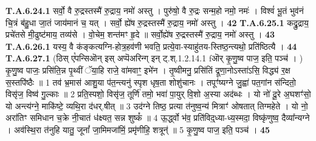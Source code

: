 \documentclass[17pt]{extarticle}
\begin{document}
                                                         \textbf{} \newline \newline
                                \textbf{ T.A.6.24.1} \newline
                  सर्वो॒ वै रु॒द्रस्तस्मै॑ रु॒द्राय॒ नमो॑ अस्तु ।  पुरु॑षो॒ वै रु॒द्रः सन्म॒हो नमो॒ नमः॑ ।  विश्वं॑ भू॒तं भुव॑नं चि॒त्रं ब॑हु॒धा जा॒तं जाय॑मानं च॒ यत् । सर्वो॒ ह्ये॑ष रु॒द्रस्तस्मै॑ रु॒द्राय॒ नमो॑ अस्तु । \textbf{ 42} \newline
                  \newline
                                                         \textbf{} \newline \newline
                                \textbf{ T.A.6.25.1} \newline
                  कद्रु॒द्राय॒ प्रचे॑तसे मी॒ढुष्ट॑माय॒ तव्य॑से । वो॒चेम॒ शन्त॑मꣳ हृ॒दे ॥ सर्वो॒ह्ये॑ष रु॒द्रस्तस्मै॑ रु॒द्राय॒ नमो॑ अस्तु । \textbf{ 43} \newline
                  \newline
                                                         \textbf{} \newline \newline
                                \textbf{ T.A.6.26.1} \newline
                  यस्य॒ वै क॑ङ्कत्यग्नि-होत्र॒हव॑णी भवति॒ प्रत्ये॒वा-स्याहु॑तय-स्तिष्ठ॒न्त्यथो॒ प्रति॑ष्ठित्यै । \textbf{ 44} \newline
                  \newline
                                                         \textbf{} \newline \newline
                                \textbf{ T.A.6.27.1} \newline
                  (ठिस् ए꣡पन्सिऒन् इस् अप्पॆअरिन्ग् इन् ट्.श्.1.2.14.1 fऒर् कृ॒णु॒ष्व पाज॒ इति॒ पञ्च॑ । )  कृ॒णु॒ष्व पाजः॒ प्रसि॑ति॒न्न पृ॒थ्वीं ॅया॒हि राजे॒ वा॑मवाꣳ॒॒ इभे॑न । तृ॒ष्वीमनु॒ प्रसि॑तिं द्रूणा॒नोऽस्ता॑ऽसि॒ विद्ध्य॑ र॒क्ष स॒स्तपि॑ष्ठैः ॥ 1  तव॑ भ्र॒मास॑ आशु॒या प॑त॒न्त्यनु॑ स्पृश धृष॒ता शोशु॑चानः । तपूꣳ॑ष्यग्ने जु॒ह्वा॑ पत॒गांन स॑न्दितो॒ विसृ॑ज॒ विष्व॑ गु॒ल्काः ॥ 2   प्रति॒स्पशो॒ विसृ॑ज॒ तूर्णि॑ तमो॒ भवा॑ पा॒युर् वि॒शो अ॒स्या अद॑ब्धः । यो नो॑ दू॒रे अ॒घशꣳ॑सो॒ यो अन्त्य॑ग्ने॒ माकि॑ष्टे॒ व्यथि॒रा  द॑धर्.षीत् ॥ 3   उद॑ग्ने तिष्ठ॒ प्रत्या त॑नुष्व॒न्य॑ मित्राꣳ॑ ओषतात् तिग्महेते । यो नो॒ अरा॑तिꣳ समिधान च॒क्रे नी॒चातं ध॑क्ष्यत॒ सन्न शुष्कं᳚ ॥ 4  ऊ॒र्द्ध्वो भ॑व॒ प्रति॑विद्॒ध्या-ध्य॒स्मदा॒ विष्कृ॑णुष्व॒ दैव्या᳚न्यग्ने । अव॑स्थि॒रा त॑नुहि यातु॒ जूनां᳚ जा॒मिमजा॑मिं॒ प्रमृ॑णीहि॒ शत्रून्॑ ॥ 5  कृ॒णु॒ष्व पाज॒ इति॒ पञ्च॑ । \textbf{ 45} \newline
\end{document}
